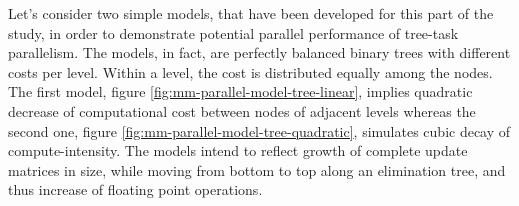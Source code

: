 Let's consider two simple models, that have been developed for this part of the study, in order to demonstrate potential parallel performance of tree-task parallelism. The models, in fact, are perfectly balanced binary trees with different costs per level. Within a level, the cost is distributed equally among the nodes. The first model, figure \ref{fig:mm-parallel-model-tree-linear}, implies 
quadratic decrease of computational cost between nodes of adjacent levels whereas the second one, figure \ref{fig:mm-parallel-model-tree-quadratic}, simulates cubic decay of compute-intensity. The models intend to reflect growth of complete update matrices in size, while moving from bottom to top along an elimination tree, and thus increase of floating point operations.\\













